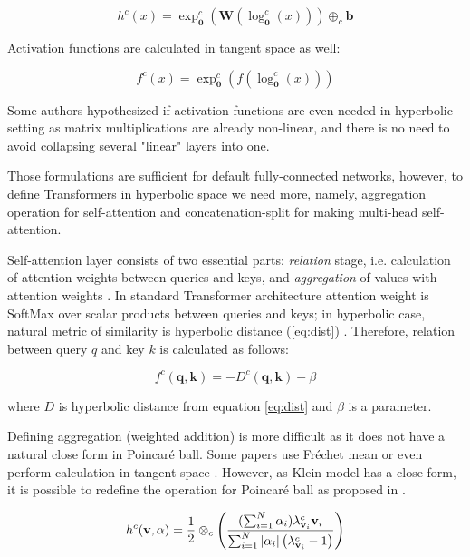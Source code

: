 \documentclass[10pt, letterpaper, twocolumn]{article}
\begin{document}
\begin{equation}
    h^c(x) = \exp_\mathbf{0}^c(\mathbf{W}(\log_\mathbf{0}^c(x))) \oplus_c \mathbf{b}
\end{equation}

Activation functions are calculated in tangent space as well:

\begin{equation}\label{eq:mobius_version}
    f^c(x) = \exp_\mathbf{0}^c(f(\log_\mathbf{0}^c(x)))
\end{equation}

Some authors hypothesized if activation functions are even needed in hyperbolic setting as matrix multiplications are already non-linear, and there is no need to avoid collapsing several "linear" layers into one.

Those formulations are sufficient for default fully-connected networks, however, to define Transformers in hyperbolic space we need more, namely, aggregation operation for self-attention and concatenation-split for making multi-head self-attention.

Self-attention layer consists of two essential parts: \emph{relation} stage, i.e. calculation of attention weights between queries and keys, and \emph{aggregation} of values with attention weights \cite{vaswani_attention_2017}. In standard Transformer architecture attention weight is SoftMax over scalar products between queries and keys; in hyperbolic case, natural metric of similarity is hyperbolic distance (\ref{eq:dist}) \cite{gulcehre_hyperbolic_2018}. Therefore, relation between query $q$ and key $k$ is calculated as follows:

\begin{equation}
    f^c(\mathbf{q}, \mathbf{k}) = -D^c(\mathbf{q}, \mathbf{k}) - \beta
\end{equation}

where $D$ is hyperbolic distance from equation \ref{eq:dist} and $\beta$ is a parameter.

Defining aggregation (weighted addition) is more difficult as it does not have a natural close form in Poincar\'e ball. Some papers use Fr\'echet mean \cite{lou_differentiating_2021} or even perform calculation in tangent space \cite{micic_hyperbolic_2018}.
However, as Klein model has a close-form, it is possible to redefine the operation for Poincar\'e ball as proposed in \cite{shimizu_hyperbolic_2021}.

\begin{equation}
    h^c(\mathbf{v}, \mathbf{\alpha}) = \frac{1}{2}\otimes_{c}\left( \frac{(\sum^N_{i=1}\alpha_i)\lambda^{c}_{\mathbf{v}_i}\mathbf{v}_i}{\sum^N_{i=1}\left|\alpha_i\right|\left( \lambda^{c}_{\mathbf{v}_i} - 1 \right)} \right)
\end{equation}
\end{document}
